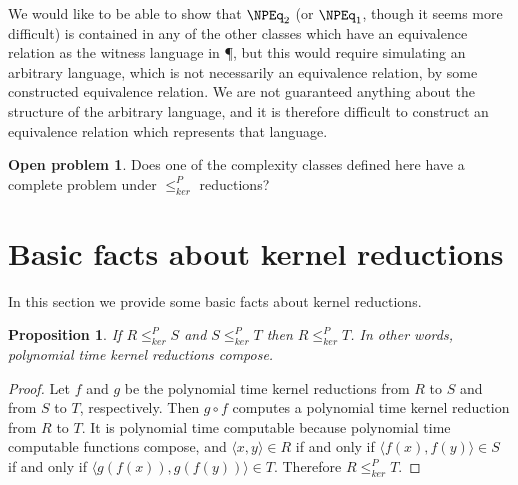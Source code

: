 \documentclass[draft]{article}
\newtheorem{proposition}[proposition]{Proposition}
\theoremstyle{definition} \newtheorem{openproblem}[openproblem]{Open problem}
\theoremstyle{definition} \newtheorem{definition}[definition]{Definition}
\newcommand{\kr}{\leq^{P}_{ker}} %
\newcommand{\pair}[2]{\langle#1,#2\rangle} %
\begin{document}
We would like to be able to show that $\NPEq_2$ (or $\NPEq_1$, though it seems more difficult) is contained in any of the other classes which have an equivalence relation as the witness language in \P, but this would require simulating an arbitrary language, which is not necessarily an equivalence relation, by some constructed equivalence relation.
We are not guaranteed anything about the structure of the arbitrary language, and it is therefore difficult to construct an equivalence relation which represents that language.

\begin{openproblem}
  Does one of the complexity classes defined here have a complete problem under $\kr$ reductions?
\end{openproblem}

\section{Basic facts about kernel reductions}

In this section we provide some basic facts about kernel reductions.

\begin{proposition}\label{prop:compose}
  If $R\kr S$ and $S\kr T$ then $R\kr T$. In other words, polynomial time kernel reductions compose.
\end{proposition}
\begin{proof}
  Let $f$ and $g$ be the polynomial time kernel reductions from $R$ to $S$ and from $S$ to $T$, respectively.
  Then $g\circ f$ computes a polynomial time kernel reduction from $R$ to $T$.
  It is polynomial time computable because polynomial time computable functions compose, and $\pair{x}{y}\in R$ if and only if $\pair{f(x)}{f(y)}\in S$ if and only if $\pair{g(f(x))}{g(f(y))}\in T$.
  Therefore $R\kr T$.
\end{proof}
\end{document}
